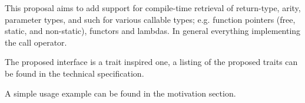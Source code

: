 This proposal aims to add support for compile-time retrieval of return-type,
arity, parameter types, and such for various callable types; e.g. function
pointers (free, static, and non-static), functors and lambdas. In general
everything implementing the call operator.

The proposed interface is a trait inspired one, a listing of the proposed
traits can be found in the technical specification.

A simple usage example can be found in the motivation section.

